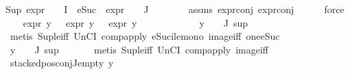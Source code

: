 \begin{isabellebody}
{\isachardoublequoteopen}{\isacharparenleft}{\kern0pt}Sup\ {\isacharparenleft}{\kern0pt}{\isacharparenleft}{\kern0pt}expr{\isacharunderscore}{\kern0pt}{}\ {\isasymcirc}\ {\isasymPhi}{\isacharparenright}{\kern0pt}\ {\isacharbackquote}{\kern0pt}\ I\ {\isasymunion}\ {\isacharparenleft}{\kern0pt}{\isacharparenleft}{\kern0pt}eSuc\ {\isasymcirc}\ expr{\isacharunderscore}{\kern0pt}{}\ {\isasymcirc}\ {\isasymPhi}{\isacharparenright}{\kern0pt}\ {\isacharbackquote}{\kern0pt}\ J{\isacharparenright}{\kern0pt}{\isacharparenright}{\kern0pt}{\isacharparenright}{\kern0pt}\ {\isasymle}\ {}{\isachardoublequoteclose}\isanewline
\ \ \ \ \isamarkupfalse%
\ assms\ expr{\isacharunderscore}{\kern0pt}{}{\isacharunderscore}{\kern0pt}conj\ expr{\isacharunderscore}{\kern0pt}{}{\isacharunderscore}{\kern0pt}conj\isanewline
\ \ \ \ \isamarkupfalse%
\ force{\isacharplus}{\kern0pt}\isanewline
\ \ \isamarkupfalse%
\ {\isachardoublequoteopen}expr{\isacharunderscore}{\kern0pt}{}\ y\ {\isasymle}\ {}{\isachardoublequoteclose}\ {\isachardoublequoteopen}expr{\isacharunderscore}{\kern0pt}{}\ y\ {\isasymle}\ {}{\isachardoublequoteclose}\ {\isachardoublequoteopen}expr{\isacharunderscore}{\kern0pt}{}\ y\ {\isasymle}\ {}{\isachardoublequoteclose}\isanewline
\ \ \ \ \ \ \isamarkupfalse%
\ {}\ \isamarkupfalse%
\ {\isacartoucheopen}y\ {\isasymin}\ {\isasymPhi}\ {\isacharbackquote}{\kern0pt}\ J{\isacartoucheclose}\ sup\ \isanewline
\ \ \ \ \isamarkupfalse%
\ {\isacharparenleft}{\kern0pt}metis\ Sup{\isacharunderscore}{\kern0pt}le{\isacharunderscore}{\kern0pt}iff\ UnCI\ comp{\isacharunderscore}{\kern0pt}apply\ eSuc{\isacharunderscore}{\kern0pt}ile{\isacharunderscore}{\kern0pt}mono\ image{\isacharunderscore}{\kern0pt}iff\ one{\isacharunderscore}{\kern0pt}eSuc{\isacharparenright}{\kern0pt}\isanewline
\ \ \ \ \isamarkupfalse%
\ {\isacartoucheopen}y\ {\isasymin}\ {\isasymPhi}\ {\isacharbackquote}{\kern0pt}\ J{\isacartoucheclose}\ sup\ \isanewline
\ \ \ \ \isamarkupfalse%
\ {\isacharparenleft}{\kern0pt}metis\ Sup{\isacharunderscore}{\kern0pt}le{\isacharunderscore}{\kern0pt}iff\ UnCI\ comp{\isacharunderscore}{\kern0pt}apply\ image{\isacharunderscore}{\kern0pt}iff{\isacharparenright}{\kern0pt}{\isacharplus}{\kern0pt}\isanewline
\ \ \isamarkupfalse%
\ \isamarkupfalse%
\ {\isachardoublequoteopen}stacked{\isacharunderscore}{\kern0pt}pos{\isacharunderscore}{\kern0pt}conj{\isacharunderscore}{\kern0pt}J{\isacharunderscore}{\kern0pt}empty\ y{\isachardoublequoteclose}\isanewline

\end{isabellebody}
